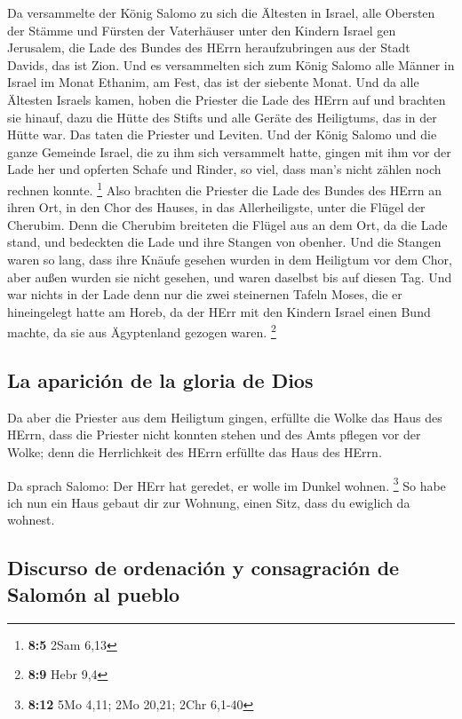  Da versammelte der König Salomo zu sich die Ältesten in
Israel, alle Obersten der Stämme und Fürsten der Vaterhäuser unter den
Kindern Israel gen Jerusalem, die Lade des Bundes des HErrn
heraufzubringen aus der Stadt Davids, das ist Zion.  Und
es versammelten sich zum König Salomo alle Männer in Israel im Monat
Ethanim, am Fest, das ist der siebente Monat.  Und da alle
Ältesten Israels kamen, hoben die Priester die Lade des HErrn auf
 und brachten sie hinauf, dazu die Hütte des Stifts und
alle Geräte des Heiligtums, das in der Hütte war. Das taten die Priester
und Leviten.  Und der König Salomo und die ganze Gemeinde
Israel, die zu ihm sich versammelt hatte, gingen mit ihm vor der Lade
her und opferten Schafe und Rinder, so viel, dass man's nicht zählen
noch rechnen konnte. \footnote{\textbf{8:5} 2Sam 6,13} 
Also brachten die Priester die Lade des Bundes des HErrn an ihren Ort,
in den Chor des Hauses, in das Allerheiligste, unter die Flügel der
Cherubim.  Denn die Cherubim breiteten die Flügel aus an
dem Ort, da die Lade stand, und bedeckten die Lade und ihre Stangen von
obenher.  Und die Stangen waren so lang, dass ihre Knäufe
gesehen wurden in dem Heiligtum vor dem Chor, aber außen wurden sie
nicht gesehen, und waren daselbst bis auf diesen Tag.  Und
war nichts in der Lade denn nur die zwei steinernen Tafeln Moses, die er
hineingelegt hatte am Horeb, da der HErr mit den Kindern Israel einen
Bund machte, da sie aus Ägyptenland gezogen waren. \footnote{\textbf{8:9}
  Hebr 9,4}

\hypertarget{la-apariciuxf3n-de-la-gloria-de-dios}{%
\subsection{La aparición de la gloria de
Dios}\label{la-apariciuxf3n-de-la-gloria-de-dios}}

 Da aber die Priester aus dem Heiligtum gingen, erfüllte
die Wolke das Haus des HErrn,  dass die Priester nicht
konnten stehen und des Amts pflegen vor der Wolke; denn die Herrlichkeit
des HErrn erfüllte das Haus des HErrn.

 Da sprach Salomo: Der HErr hat geredet, er wolle im
Dunkel wohnen. \footnote{\textbf{8:12} 5Mo 4,11; 2Mo 20,21; 2Chr 6,1-40}
 So habe ich nun ein Haus gebaut dir zur Wohnung, einen
Sitz, dass du ewiglich da wohnest.

\hypertarget{discurso-de-ordenaciuxf3n-y-consagraciuxf3n-de-salomuxf3n-al-pueblo}{%
\subsection{Discurso de ordenación y consagración de Salomón al
pueblo}\label{discurso-de-ordenaciuxf3n-y-consagraciuxf3n-de-salomuxf3n-al-pueblo}}

